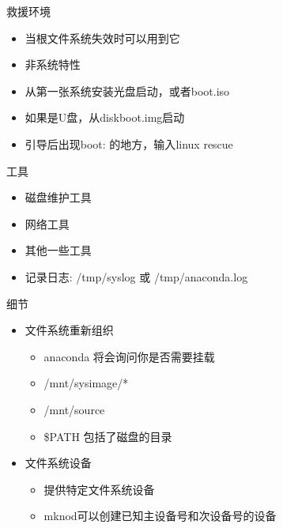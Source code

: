 \begin{frame}{救援环境}
\begin{itemize}
\item 当根文件系统失效时可以用到它
\item 非系统特性
\item 从第一张系统安装光盘启动，或者boot.iso
\item 如果是U盘，从diskboot.img启动
\item 引导后出现boot: 的地方，输入\alert{linux rescue}
\end{itemize}

\end{frame} 
\begin{frame}{工具}


\begin{itemize}
\item 磁盘维护工具
\item 网络工具
\item 其他一些工具
\item 记录日志: /tmp/syslog 或 /tmp/anaconda.log
\end{itemize}

\end{frame} 
\begin{frame}{细节}
\begin{itemize}
\item 文件系统重新组织

\begin{itemize}
\item anaconda 将会询问你是否需要挂载
\item /mnt/sysimage/{*}
\item /mnt/source
\item \$PATH 包括了磁盘的目录
\end{itemize}
\item 文件系统设备

\begin{itemize}
\item 提供特定文件系统设备
\item mknod可以创建已知主设备号和次设备号的设备
\end{itemize}
\end{itemize}
\end{frame} 


